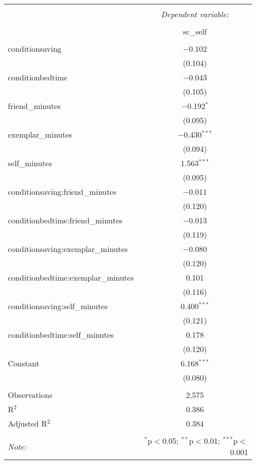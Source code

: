 
\begin{table}[!htbp] \centering 
  \caption{} 
  \label{} 
\begin{tabular}{@{\extracolsep{5pt}}lc} 
\\[-1.8ex]\hline 
\hline \\[-1.8ex] 
 & \multicolumn{1}{c}{\textit{Dependent variable:}} \\ 
\cline{2-2} 
\\[-1.8ex] & sc\_self \\ 
\hline \\[-1.8ex] 
 conditionsaving & $-$0.102 \\ 
  & (0.104) \\ 
  conditionbedtime & $-$0.043 \\ 
  & (0.105) \\ 
  friend\_minutes & $-$0.192$^{*}$ \\ 
  & (0.095) \\ 
  exemplar\_minutes & $-$0.430$^{***}$ \\ 
  & (0.094) \\ 
  self\_minutes & 1.563$^{***}$ \\ 
  & (0.095) \\ 
  conditionsaving:friend\_minutes & $-$0.011 \\ 
  & (0.120) \\ 
  conditionbedtime:friend\_minutes & $-$0.013 \\ 
  & (0.119) \\ 
  conditionsaving:exemplar\_minutes & $-$0.080 \\ 
  & (0.120) \\ 
  conditionbedtime:exemplar\_minutes & 0.101 \\ 
  & (0.116) \\ 
  conditionsaving:self\_minutes & 0.400$^{***}$ \\ 
  & (0.121) \\ 
  conditionbedtime:self\_minutes & 0.178 \\ 
  & (0.120) \\ 
  Constant & 6.168$^{***}$ \\ 
  & (0.080) \\ 
 \hline \\[-1.8ex] 
Observations & 2,575 \\ 
R$^{2}$ & 0.386 \\ 
Adjusted R$^{2}$ & 0.384 \\ 
\hline 
\hline \\[-1.8ex] 
\textit{Note:}  & \multicolumn{1}{r}{$^{*}$p$<$0.05; $^{**}$p$<$0.01; $^{***}$p$<$0.001} \\ 
\end{tabular} 
\end{table} 
